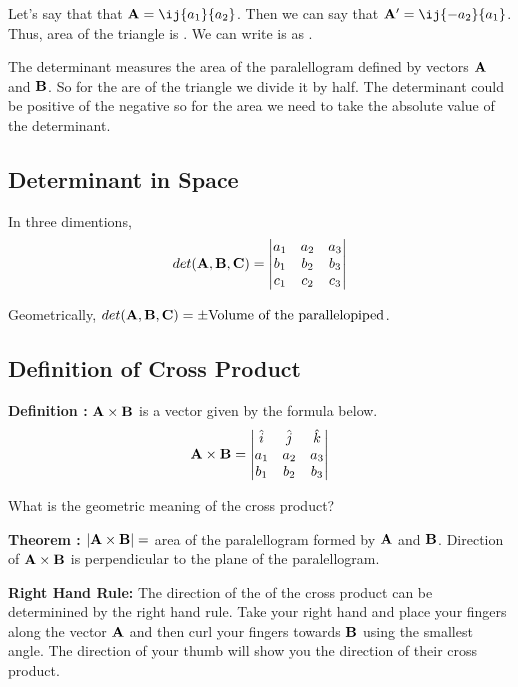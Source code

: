 Let's say that that ${\bf A} = \ij{a_1}{a_2}$. Then we can say that ${\bf A'} = \ij{-a_2}{a_1}$.
Thus, area of the triangle is .
We can write is as 
.

The determinant measures the area of the paralellogram defined by vectors ${\bf A}$ and ${\bf B}$. 
So for the are of the triangle we divide it by half.
The determinant could be positive of the negative so for the area we need to take the absolute value of the determinant.

\subsection{Determinant in Space}

In three dimentions,
$$
det({\bf A}, {\bf B}, {\bf C}) = 
\begin{vmatrix*}
    a_1 & a_2 & a_3 \\
    b_1 & b_2 & b_3 \\
    c_1 & c_2 & c_3 
\end{vmatrix*}
$$

Geometrically, $det({\bf A}, {\bf B}, {\bf C}) = \pm \text{Volume of the parallelopiped}$.

\subsection{Definition of Cross Product}

{\bf Definition : } ${\bf A} \times {\bf B}$ is a vector given by the formula below.
$$
{\bf A} \times {\bf B} = 
\begin{vmatrix*}
    \hat{i} & \hat{j} & \hat{k} \\
    a_1 & a_2 & a_3 \\
    b_1 & b_2 & b_3
\end{vmatrix*}
$$

What is the geometric meaning of the cross product?


{\bf Theorem : } $|{\bf A} \times {\bf B}| = $ area of the paralellogram formed by ${\bf A}$ and  ${\bf B}$.
Direction of ${\bf A} \times {\bf B}$ is perpendicular to the plane of the paralellogram.


{\bf Right Hand Rule: } The direction of the of the cross product can be determinined by the right hand rule. 
Take your right hand and place your fingers along the vector ${\bf A}$ and then curl your fingers towards ${\bf B}$ using the smallest angle.
The direction of your thumb will show you the direction of their cross product.

